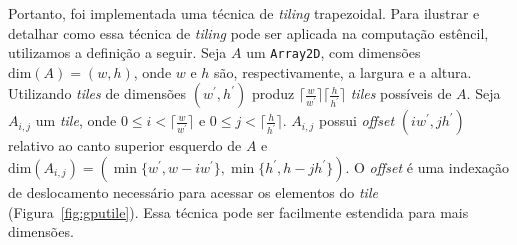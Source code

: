 \documentclass[12pt]{article}
\newcommand{\fw}{\textit{framework}\xspace}
\newcommand{\pskel}{PSkel\xspace}
\begin{document}

Portanto, foi implementada uma técnica de \textit{tiling} trapezoidal. Para
ilustrar e detalhar como essa técnica de \textit{tiling} pode ser aplicada na
computação estêncil, utilizamos a definição a seguir. Seja $A$ um
\texttt{Array2D}, com dimensões $\textrm{dim}(A)  =  (w,  h)$, onde $w$ e  $h$
são, respectivamente, a largura e a altura. Utilizando \textit{tiles} de
dimensões $(w^\prime, h^\prime)$ produz
$\lceil\frac{w}{w^\prime}\rceil\lceil\frac{h}{h^\prime}\rceil$ \textit{tiles}
possíveis de $A$. Seja $A_{i,j}$ um \textit{tile}, onde
$0\leq i < \lceil\frac{w}{ w^\prime}\rceil$ e
$0\leq j < \lceil\frac{h}{ h^\prime}\rceil$.
$A_{i,j}$ possui \textit{offset} $(i w^\prime,j h^\prime)$ relativo ao canto superior esquerdo de $A$ e $\textrm{dim}(A_{i,j}) = (
\min\{w^\prime, w-i w^\prime\},
\min\{h^\prime, h-j h^\prime\})$.
O \textit{offset} é uma indexação de deslocamento necessário para acessar os elementos do \textit{tile} (Figura~\ref{fig:gputile}).
Essa técnica pode ser facilmente estendida para mais dimensões.
\end{document}
